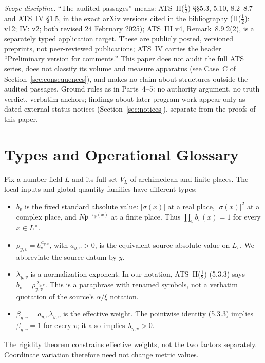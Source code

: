 \documentclass[11pt,a4paper]{article}
\theoremstyle{definition}
\theoremstyle{remark}
\begin{document}
\emph{Scope discipline.} ``The audited passages'' means: ATS~II($\tfrac12$)
\S\S5.3, 5.10, 8.2--8.7 and ATS~IV \S1.5, in the exact arXiv versions cited
in the bibliography (II($\tfrac12$): v12; IV: v2; both revised 24 February
2025); ATS~III v4, Remark~8.9.2(2), is a separately typed
application target. These are publicly posted, versioned preprints, not peer-reviewed
publications; ATS~IV carries the header ``Preliminary version for comments.''
This paper does not audit the full ATS series, does not classify its volume
and measure apparatus (see Case~C of Section~\ref{sec:consequences}), and
makes no claim about structures outside the audited passages. Ground rules as
in Parts~4--5: no authority argument, no truth verdict, verbatim anchors;
findings about later program work appear only as dated external status
notices (Section~\ref{sec:notices}), separate from the proofs of this paper.

\section{Types and Operational Glossary}\label{sec:types}

Fix a number field $L$ and its full set $V_L$ of archimedean and finite
places. The local inputs and global quantity families have different types:
\begin{itemize}
\item $b_v$ is the fixed standard absolute value: $|\sigma(x)|$ at a real
place, $|\sigma(x)|^2$ at a complex place, and
$N\mathfrak p^{-v_{\mathfrak p}(x)}$ at a finite place. Thus
$\prod_v b_v(x)=1$ for every $x\in L^\times$.
\item $\rho_{y,v}=b_v^{\,a_{y,v}}$, with $a_{y,v}>0$, is the equivalent
source absolute value on $L_v$. We abbreviate the source datum by $y$.
\item $\lambda_{y,v}$ is a normalization exponent. In our notation,
ATS~II($\tfrac12$) (5.3.3) \cite{joshiIIhalf} says
$b_v=\rho_{y,v}^{\,\lambda_{y,v}}$. This is a paraphrase with renamed
symbols, not a verbatim quotation of the source's $\alpha/\xi$ notation.
\item $\beta_{y,v}=a_{y,v}\lambda_{y,v}$ is the effective weight.
The pointwise identity (5.3.3) implies $\beta_{y,v}=1$ for every $v$;
it also implies $\lambda_{y,v}>0$.
\end{itemize}
The rigidity theorem constrains effective weights, not the two factors
separately. Coordinate variation therefore need not change metric values.
\end{document}

